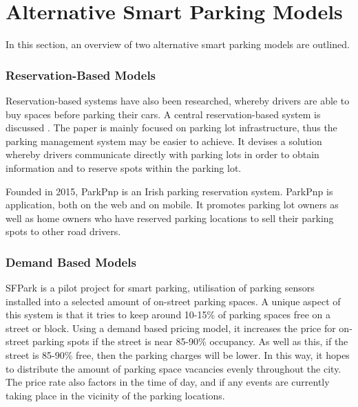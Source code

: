 \section{Alternative Smart Parking Models}
In this section, an overview of two alternative smart parking models are outlined.

\subsubsection{Reservation-Based Models}
Reservation-based systems have also been researched, whereby drivers are able to buy spaces before parking their cars. A central reservation-based system is discussed \citep{2}. The paper is mainly focused on parking lot infrastructure, thus the parking management system may be easier to achieve. It devises a solution whereby drivers communicate directly with parking lots in order to obtain information and to reserve spots within the parking lot.

Founded in 2015, ParkPnp \citep{2015ParkPnp} is an Irish parking reservation system. ParkPnp is application, both on the web and on mobile. It promotes parking lot owners as well as home owners who have reserved parking locations to sell their parking spots to other road drivers.

\subsubsection{Demand Based Models}
SFPark \citep{12} is a pilot project for smart parking, utilisation of parking sensors installed into a selected amount of on-street parking spaces. A unique aspect of this system is that it tries to keep around 10-15\% of parking spaces free on a street or block. Using a demand based pricing model, it increases the price for on-street parking spots if the street is near 85-90\% occupancy. As well as this, if the street is 85-90\% free, then the parking charges will be lower. In this way, it hopes to distribute the amount of parking space vacancies evenly throughout the city. The price rate also factors in the time of day, and if any events are currently taking place in the vicinity of the parking locations.